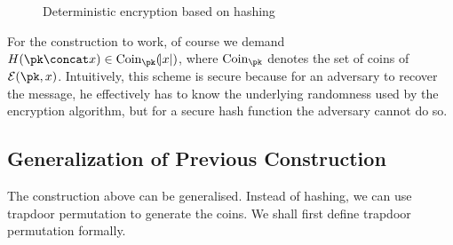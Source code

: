 \begin{figure}[H]
\begin{pchstack}[center]
	
	\pchspace
	
	
	\pchspace
	
\end{pchstack}

\caption{Deterministic encryption based on hashing}
\end{figure}


For the construction to work, of course we demand $H(\pk \concat x) \in \text{Coin}_{\pk}(\abs{x})$, where $\text{Coin}_{\pk}$ denotes the set of coins of $\mathcal{E}(\pk, x)$. Intuitively, this scheme is secure because for an adversary to recover the message, he effectively has to know the underlying randomness used by the encryption algorithm, but for a secure hash function the adversary cannot do so.


\subsection{Generalization of Previous Construction}
The construction above can be generalised. Instead of hashing, we can use trapdoor permutation to generate the coins. We shall first define trapdoor permutation formally.

